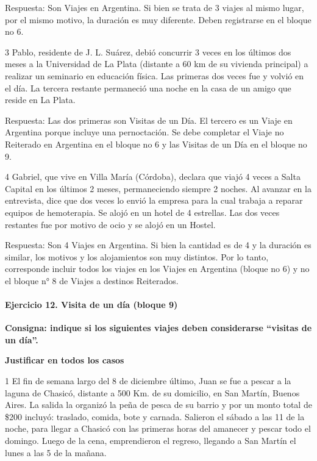 \documentclass[
  openany]{book}
\begin{document}
Respuesta: Son Viajes en Argentina. Si bien se trata de 3 viajes al mismo lugar, por el mismo motivo, la duración es muy diferente. Deben registrarse en el bloque no 6.

3 Pablo, residente de J. L. Suárez, debió concurrir 3 veces en los últimos dos meses a la Universidad de La Plata (distante a 60 km de su vivienda principal) a realizar un seminario en educación física. Las primeras dos veces fue y volvió en el día. La tercera restante permaneció una noche en la casa de un amigo que reside en La Plata.

Respuesta: Las dos primeras son Visitas de un Día. El tercero es un Viaje en Argentina porque incluye una pernoctación. Se debe completar el Viaje no Reiterado en Argentina en el bloque no 6 y las Visitas de un Día en el bloque no 9.

4 Gabriel, que vive en Villa María (Córdoba), declara que viajó 4 veces a Salta Capital en los últimos 2 meses, permaneciendo siempre 2 noches. Al avanzar en la entrevista, dice que dos veces lo envió la empresa para la cual trabaja a reparar equipos de hemoterapia. Se alojó en un hotel de 4 estrellas. Las dos veces restantes fue por motivo de ocio y se alojó en un Hostel.

Respuesta: Son 4 Viajes en Argentina. Si bien la cantidad es de 4 y la duración es similar, los motivos y los alojamientos son muy distintos. Por lo tanto, corresponde incluir todos los viajes en los Viajes en Argentina (bloque no 6) y no el bloque n° 8 de Viajes a destinos Reiterados.

\hypertarget{ejercicio-12.-visita-de-un-duxeda-bloque-9}{%
\paragraph{Ejercicio 12. Visita de un día (bloque 9)}\label{ejercicio-12.-visita-de-un-duxeda-bloque-9}}

\textbf{Consigna: indique si los siguientes viajes deben considerarse ``visitas de un día''.}

\textbf{Justificar en todos los casos}

1 El fin de semana largo del 8 de diciembre último, Juan se fue a pescar a la laguna de Chasicó, distante a 500 Km. de su domicilio, en San Martín, Buenos Aires. La salida la organizó la peña de pesca de su barrio y por un monto total de \$200 incluyó: traslado, comida, bote y carnada. Salieron el sábado a las 11 de la noche, para llegar a Chasicó con las primeras horas del amanecer y pescar todo el domingo. Luego de la cena, emprendieron el regreso, llegando a San Martín el lunes a las 5 de la mañana.
\end{document}

